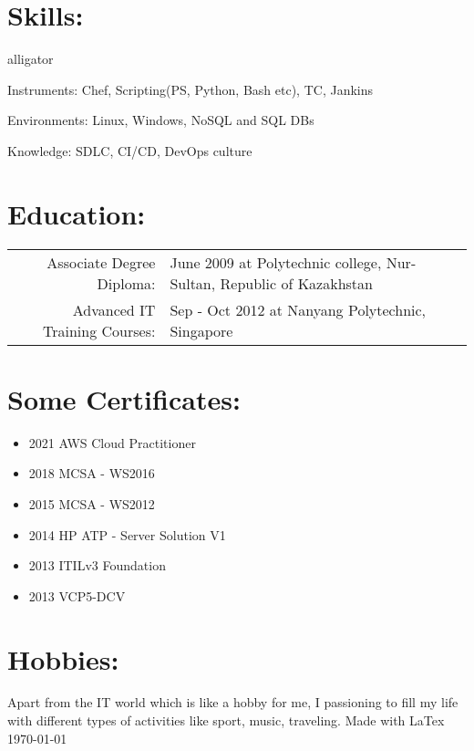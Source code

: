 \documentclass[a4paper,10pt]{article}
\begin{document}
\section*{Skills:}
\begin{labeling}{alligator}
  \item [Instruments:] Chef, Scripting(PS, Python, Bash etc), TC, Jankins
  \item [Environments:] Linux, Windows, NoSQL and SQL DBs
  \item [Knowledge:] SDLC, CI/CD, DevOps culture
\end{labeling}
\section*{Education:}
\begin{tabular}{r|p{11cm}}
  Associate Degree Diploma: &  June 2009 at Polytechnic college, Nur-Sultan, Republic of Kazakhstan\\
  Advanced IT Training Courses: &  Sep - Oct 2012 at Nanyang Polytechnic, Singapore\\
\end{tabular}
\section*{Some Certificates:}
\begin{itemize}
  \item 2021 AWS Cloud Practitioner
  \item 2018 MCSA - WS2016
  \item 2015 MCSA - WS2012
  \item 2014 HP ATP - Server Solution V1
  \item 2013 ITILv3 Foundation 
  \item 2013 VCP5-DCV
\end{itemize}
\section*{Hobbies:}
\textnormal{Apart from the IT world which is like a hobby for me, I passioning to fill my life with different types of activities like sport, music, traveling.}
\mbox{}
\vfill
\textcopyright Made with LaTex \today
\end{document}

